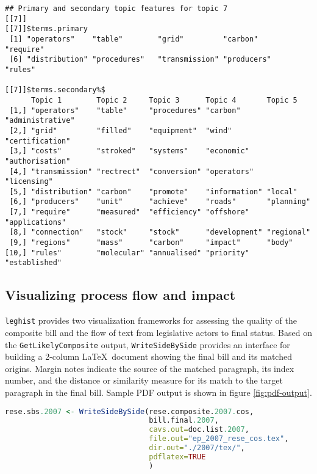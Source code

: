 \documentclass[11pt]{article}
\begin{document}
\begin{verbatim}
## Primary and secondary topic features for topic 7 
[[7]]
[[7]]$terms.primary
 [1] "operators"    "table"        "grid"         "carbon"       "require"     
 [6] "distribution" "procedures"   "transmission" "producers"    "rules"       

[[7]]$terms.secondary%$
      Topic 1        Topic 2     Topic 3      Topic 4       Topic 5         
 [1,] "operators"    "table"     "procedures" "carbon"      "administrative"
 [2,] "grid"         "filled"    "equipment"  "wind"        "certification" 
 [3,] "costs"        "stroked"   "systems"    "economic"    "authorisation" 
 [4,] "transmission" "rectrect"  "conversion" "operators"   "licensing"     
 [5,] "distribution" "carbon"    "promote"    "information" "local"         
 [6,] "producers"    "unit"      "achieve"    "roads"       "planning"      
 [7,] "require"      "measured"  "efficiency" "offshore"    "applications"  
 [8,] "connection"   "stock"     "stock"      "development" "regional"      
 [9,] "regions"      "mass"      "carbon"     "impact"      "body"          
[10,] "rules"        "molecular" "annualised" "priority"    "established" 
\end{verbatim}

\subsection{Visualizing process flow and impact}
\label{sec:visu-proc-flow}

\texttt{leghist} provides two visualization frameworks for assessing
the quality of the composite bill and the flow of text from
legislative actors to final status. Based on the
\texttt{GetLikelyComposite} output, \texttt{WriteSideBySide} provides
an interface for building a 2-column \LaTeX\ document showing the final
bill and its matched origins. Margin notes indicate the source of the
matched paragraph, its index number, and the distance or similarity
measure for its match to the target paragraph in the final
bill. Sample PDF output is shown in figure \ref{fig:pdf-output}.

\begin{lstlisting}[language=R]
rese.sbs.2007 <- WriteSideBySide(rese.composite.2007.cos,
                                 bill.final.2007,
                                 cavs.out=doc.list.2007,
                                 file.out="ep_2007_rese_cos.tex",
                                 dir.out="./2007/tex/",
                                 pdflatex=TRUE
                                 )
\end{lstlisting}
\end{document}
